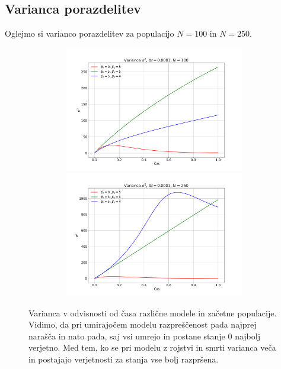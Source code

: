 \documentclass[11pt, a4paper]{article}
\begin{document}
 \subsection{Varianca porazdelitev}
Oglejmo si varianco porazdelitev za populacijo $N = 100$ in $N= 250$.
 \begin{figure}[H]
\centering

  \includegraphics[width=15cm, height=5.5cm]{druga_3.pdf}
    \includegraphics[width=15cm, height=5.5cm]{druga_4.pdf}

  \caption{Varianca v odvisnosti od časa različne modele in začetne populacije. Vidimo, da pri umirajočem modelu razpreščenost pada najprej narašča in nato pada, saj vsi umrejo in postane stanje 0 najbolj verjetno. Med tem, ko se pri modelu z rojstvi in smrti varianca veča in postajajo verjetnosti za stanja vse bolj razpršena.}

   
 \end{figure}
\end{document}
